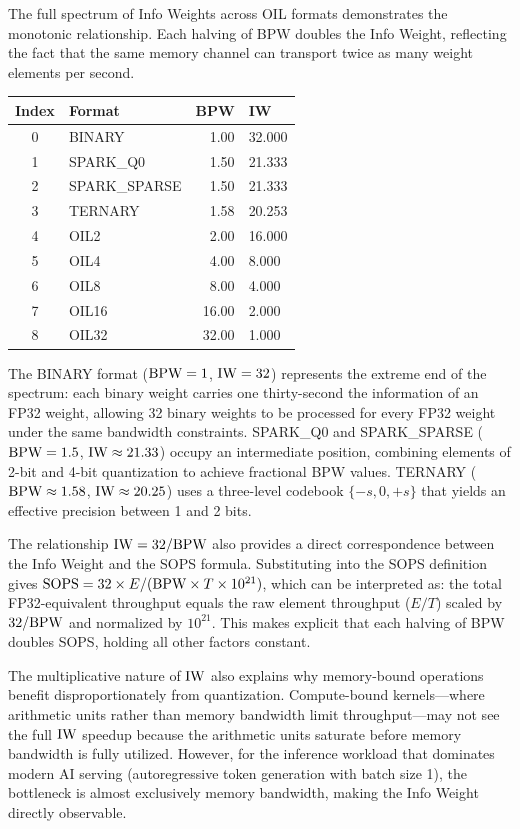 The full spectrum of Info Weights across OIL formats demonstrates the monotonic relationship. Each halving of BPW doubles the Info Weight, reflecting the fact that the same memory channel can transport twice as many weight elements per second.

\begin{center}
\tablestyle
\begin{tabular}{clrl}
\toprule
\textbf{Index} & \textbf{Format} & \textbf{BPW} & \textbf{IW} \\
\midrule
0 & BINARY & 1.00 & 32.000 \\
1 & SPARK\_Q0 & 1.50 & 21.333 \\
2 & SPARK\_SPARSE & 1.50 & 21.333 \\
3 & TERNARY & 1.58 & 20.253 \\
4 & OIL2 & 2.00 & 16.000 \\
5 & OIL4 & 4.00 & 8.000 \\
6 & OIL8 & 8.00 & 4.000 \\
7 & OIL16 & 16.00 & 2.000 \\
8 & OIL32 & 32.00 & 1.000 \\
\bottomrule
\end{tabular}
\end{center}

The BINARY format ($\textnormal{BPW} = 1$, $\mathrm{IW} = 32$) represents the extreme end of the spectrum: each binary weight carries one thirty-second the information of an FP32 weight, allowing 32 binary weights to be processed for every FP32 weight under the same bandwidth constraints. SPARK\_Q0 and SPARK\_SPARSE ($\textnormal{BPW} = 1.5$, $\mathrm{IW} \approx 21.33$) occupy an intermediate position, combining elements of 2-bit and 4-bit quantization to achieve fractional BPW values. TERNARY ($\textnormal{BPW} \approx 1.58$, $\mathrm{IW} \approx 20.25$) uses a three-level codebook $\{-s, 0, +s\}$ that yields an effective precision between 1 and 2 bits.

The relationship $\mathrm{IW} = 32 / \textnormal{BPW}$ also provides a direct correspondence between the Info Weight and the SOPS formula. Substituting into the SOPS definition gives $\text{SOPS} = 32 \times E / (\textnormal{BPW} \times T \times 10^{21})$, which can be interpreted as: the total FP32-equivalent throughput equals the raw element throughput ($E/T$) scaled by $32/\textnormal{BPW}$ and normalized by $10^{21}$. This makes explicit that each halving of BPW doubles SOPS, holding all other factors constant.

The multiplicative nature of $\mathrm{IW}$ also explains why memory-bound operations benefit disproportionately from quantization. Compute-bound kernels---where arithmetic units rather than memory bandwidth limit throughput---may not see the full $\mathrm{IW}$ speedup because the arithmetic units saturate before memory bandwidth is fully utilized. However, for the inference workload that dominates modern AI serving (autoregressive token generation with batch size 1), the bottleneck is almost exclusively memory bandwidth, making the Info Weight directly observable.

